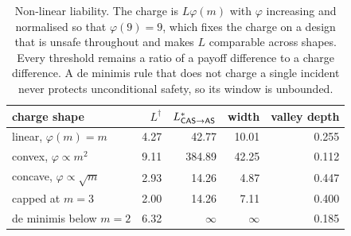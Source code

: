 \begin{table}[!ht]
\centering
\caption{Non-linear liability. The charge is $L\varphi(m)$ with $\varphi$ increasing and normalised so that $\varphi(9)=9$, which fixes the charge on a design that is unsafe throughout and makes $L$ comparable across shapes. Every threshold remains a ratio of a payoff difference to a charge difference. A de minimis rule that does not charge a single incident never protects unconditional safety, so its window is unbounded.}
\label{tab:charges}
\begin{tabular}{lrrrr}
\toprule
charge shape & $L^{\dagger}$ & $L^{*}_{\textsf{CAS}\to\textsf{AS}}$ & width & valley depth \\
\midrule
linear, $\varphi(m)=m$ & 4.27 & 42.77 & 10.01 & 0.255 \\
convex, $\varphi\propto m^{2}$ & 9.11 & 384.89 & 42.25 & 0.112 \\
concave, $\varphi\propto\sqrt{m}$ & 2.93 & 14.26 & 4.87 & 0.447 \\
capped at $m=3$ & 2.00 & 14.26 & 7.11 & 0.400 \\
de minimis below $m=2$ & 6.32 & $\infty$ & $\infty$ & 0.185 \\
\bottomrule
\end{tabular}
\end{table}
